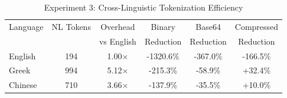 \begin{table}[htbp]
\centering
\caption{Experiment 3: Cross-Linguistic Tokenization Efficiency}
\begin{tabular}{lccccc}
\toprule
Language & NL Tokens & Overhead & Binary & Base64 & Compressed \\
& & vs English & Reduction & Reduction & Reduction \\
\midrule
English & 194 & 1.00$\times$ & -1320.6\% & -367.0\% & -166.5\% \\
Greek & 994 & 5.12$\times$ & -215.3\% & -58.9\% & +32.4\% \\
Chinese & 710 & 3.66$\times$ & -137.9\% & -35.5\% & +10.0\% \\
\bottomrule
\end{tabular}
\label{tab:exp3_results}
\end{table}
